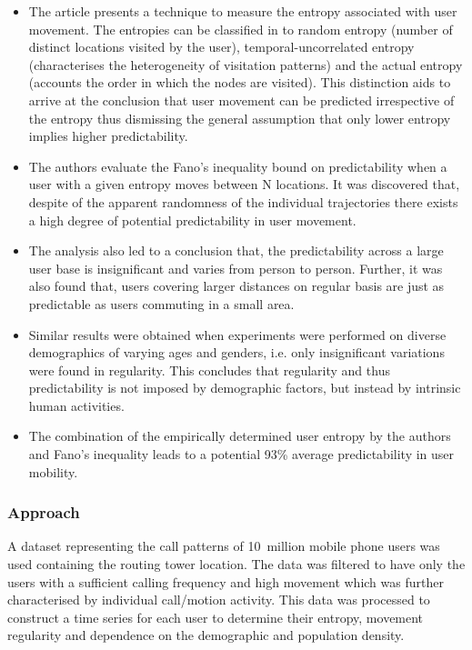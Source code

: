 \begin{itemize}

	\item The article presents a technique to measure the entropy associated with user movement. 
	The entropies can be classified in to random entropy (number of distinct locations visited by the user), 
	temporal-uncorrelated entropy (characterises the heterogeneity of visitation patterns) and the actual
	entropy (accounts the order in which the nodes are visited). This distinction aids to arrive at the 
	conclusion that user movement can be predicted irrespective of the entropy thus dismissing the 
	general assumption that only lower entropy implies higher predictability. 
		
	\item The authors evaluate the Fano's inequality bound on predictability when a user with a given entropy 
	moves between N locations. It was discovered that, despite of the apparent randomness of the individual
	trajectories there exists a high degree of potential predictability in user movement. 
	
	\item The analysis also led to a conclusion that, the predictability across a large user base is insignificant 
	and varies from person to person. Further, it was also found that, users covering larger distances on regular 
	basis are just as predictable as users commuting in a small area. 
	
	\item Similar results were obtained when experiments were performed on diverse demographics of varying ages and 
	genders, i.e. only insignificant variations were found in regularity. This concludes that regularity and thus 
	predictability is not imposed by demographic factors, but instead by intrinsic human activities. 
	
	\item The combination of the empirically determined user entropy by the authors and Fano's inequality leads 
	to a potential 93\% average predictability in user mobility. 
	
\end{itemize}

\subsubsection*{Approach}

A dataset representing the call patterns of 10~million mobile phone users was used containing the routing tower 
location. The data was filtered to have only the users with a sufficient calling frequency and high 
movement which was further characterised by individual call/motion activity. This data was processed to construct 
a time series for each user to determine their entropy, movement regularity and dependence on the demographic
and population density. 
 
